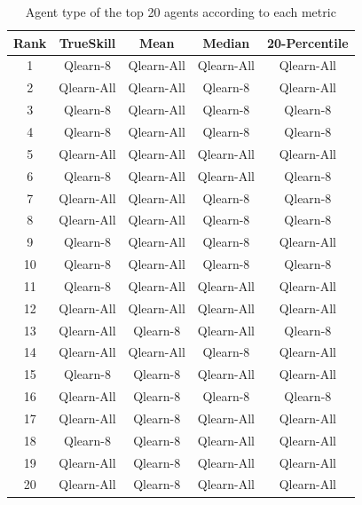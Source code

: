 \begin{table}[H]
\centering
\begin{tabular}{|| c | c | c | c | c ||} 
 \hline
 Rank & TrueSkill & Mean & Median & 20-Percentile \\ [0.5ex] 
 \hline\hline
   1 &    Qlearn-8 &  Qlearn-All &  Qlearn-All &    Qlearn-All \\
   2 &  Qlearn-All &  Qlearn-All &    Qlearn-8 &    Qlearn-All \\
   3 &    Qlearn-8 &  Qlearn-All &    Qlearn-8 &      Qlearn-8 \\
   4 &    Qlearn-8 &  Qlearn-All &    Qlearn-8 &      Qlearn-8 \\
   5 &  Qlearn-All &  Qlearn-All &  Qlearn-All &    Qlearn-All \\
   6 &    Qlearn-8 &  Qlearn-All &  Qlearn-All &      Qlearn-8 \\
   7 &  Qlearn-All &  Qlearn-All &    Qlearn-8 &      Qlearn-8 \\
   8 &  Qlearn-All &  Qlearn-All &    Qlearn-8 &      Qlearn-8 \\
   9 &    Qlearn-8 &  Qlearn-All &    Qlearn-8 &    Qlearn-All \\
  10 &    Qlearn-8 &  Qlearn-All &    Qlearn-8 &      Qlearn-8 \\
  11 &    Qlearn-8 &  Qlearn-All &  Qlearn-All &    Qlearn-All \\
  12 &  Qlearn-All &  Qlearn-All &  Qlearn-All &    Qlearn-All \\
  13 &  Qlearn-All &    Qlearn-8 &  Qlearn-All &      Qlearn-8 \\
  14 &  Qlearn-All &  Qlearn-All &    Qlearn-8 &    Qlearn-All \\
  15 &    Qlearn-8 &    Qlearn-8 &  Qlearn-All &    Qlearn-All \\
  16 &  Qlearn-All &    Qlearn-8 &    Qlearn-8 &      Qlearn-8 \\
  17 &  Qlearn-All &    Qlearn-8 &  Qlearn-All &    Qlearn-All \\
  18 &    Qlearn-8 &    Qlearn-8 &  Qlearn-All &    Qlearn-All \\
  19 &  Qlearn-All &    Qlearn-8 &  Qlearn-All &    Qlearn-All \\
  20 &  Qlearn-All &    Qlearn-8 &  Qlearn-All &    Qlearn-All \\[1ex] 
 \hline
\end{tabular}
\label{TypeRankings}
\caption{Agent type of the top 20 agents according to each metric}
\end{table}

